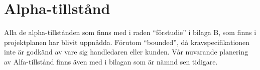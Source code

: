 \section{Alpha-tillstånd}
Alla de alpha-tillstånden som finns med i raden “förstudie” i bilaga B, som finns i projektplanen har blivit uppnådda. Förutom “bounded”, då kravspecifikationen inte är godkänd av vare sig handledaren eller kunden. Vår nuvarande planering av Alfa-tillstånd finns även med i bilagan som är nämnd sen tidigare. 